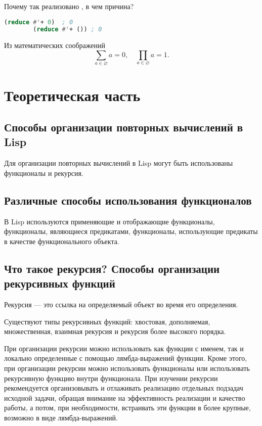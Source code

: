 \documentclass[a4paper,oneside,12pt]{extreport}
\begin{document}
\begin{task}
	Почему так реализовано , в чем причина?

	\begin{lstlisting}[language=Lisp, gobble=16]
		(reduce #'+ 0)  ; 0
		(reduce #'+ ()) ; 0
	\end{lstlisting}

	Из математических соображений
	\begin{equation}
		\sum_{a\in\varnothing} a = 0, \quad \prod_{a\in\varnothing} a = 1.
	\end{equation}
\end{task}

\section*{Теоретическая часть}

\subsection*{Способы организации повторных вычислений в Lisp}

Для организации повторных вычислений в Lisp могут быть использованы функционалы и рекурсия.

\subsection*{Различные способы использования функционалов}

В Lisp используются применяющие и отображающие функционалы, функционалы, являющиеся предикатами, функционалы, использующие предикаты в качестве функционального объекта.

\subsection*{Что такое рекурсия? Способы организации рекурсивных функций}

Рекурсия — это ссылка на определяемый объект во время его определения.

Существуют типы рекурсивных функций: хвостовая, дополняемая, множественная, взаимная рекурсия и рекурсия более высокого порядка.

При организации рекурсии можно использовать как функции с именем, так и локально определенные с помощью лямбда-выражений функции.
Кроме этого, при организации рекурсии можно использовать функционалы или использовать рекурсивную функцию внутри функционала.
При изучении рекурсии рекомендуется организовывать и отлаживать реализацию отдельных подзадач исходной задачи, обращая внимание на эффективность реализации и качество работы, а потом, при необходимости, встраивать эти функции в более крупные, возможно в виде лямбда-выражений.
\end{document}
